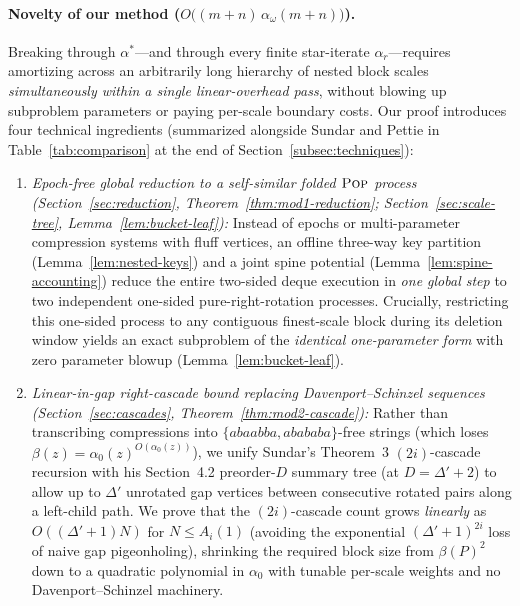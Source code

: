 \documentclass[11pt]{article}
\theoremstyle{definition}
\theoremstyle{remark}
\newcommand{\POP}{\textnormal{\scshape Pop}}
\begin{document}
\paragraph{Novelty of our method ($O\big((m + n)\,\alpha_\omega(m + n)\big)$).}
Breaking through $\alpha^*$---and through every finite star-iterate $\alpha_r$---requires amortizing across an arbitrarily long hierarchy of nested block scales \emph{simultaneously within a single linear-overhead pass}, without blowing up subproblem parameters or paying per-scale boundary costs. Our proof introduces four technical ingredients (summarized alongside Sundar and Pettie in Table~\ref{tab:comparison} at the end of Section~\ref{subsec:techniques}):
\begin{enumerate}[label=(\arabic*), leftmargin=2em, itemsep=2pt]
  \item \emph{Epoch-free global reduction to a self-similar folded $\POP$ process (Section~\ref{sec:reduction}, Theorem~\ref{thm:mod1-reduction}; Section~\ref{sec:scale-tree}, Lemma~\ref{lem:bucket-leaf}):} Instead of epochs or multi-parameter compression systems with fluff vertices, an offline three-way key partition (Lemma~\ref{lem:nested-keys}) and a joint spine potential (Lemma~\ref{lem:spine-accounting}) reduce the entire two-sided deque execution in \emph{one global step} to two independent one-sided pure-right-rotation processes. Crucially, restricting this one-sided process to any contiguous finest-scale block during its deletion window yields an exact subproblem of the \emph{identical one-parameter form} with zero parameter blowup (Lemma~\ref{lem:bucket-leaf}).
  \item \emph{Linear-in-gap right-cascade bound replacing Davenport--Schinzel sequences (Section~\ref{sec:cascades}, Theorem~\ref{thm:mod2-cascade}):} Rather than transcribing compressions into $\{a b a a b b a, a b a b a b a\}$-free strings (which loses $\beta(z) = \alpha_0(z)^{O(\alpha_0(z))}$), we unify Sundar's Theorem~3 $(2i)$-cascade recursion with his Section~4.2 preorder-$D$ summary tree (at $D = \Delta' + 2$) to allow up to $\Delta'$ unrotated gap vertices between consecutive rotated pairs along a left-child path. We prove that the $(2i)$-cascade count grows \emph{linearly} as $O((\Delta' + 1) N)$ for $N \le A_i(1)$ (avoiding the exponential $(\Delta' + 1)^{2i}$ loss of naive gap pigeonholing), shrinking the required block size from $\beta(P)^2$ down to a quadratic polynomial in $\alpha_0$ with tunable per-scale weights and no Davenport--Schinzel machinery.

\end{enumerate}
\end{document}
